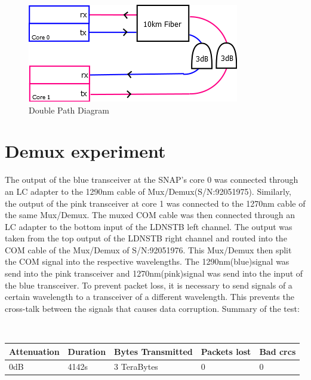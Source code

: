 \documentclass{article}
\begin{document}
\begin{figure}[h!]
\centering
\includegraphics[width=.5\textwidth]{doublepath080415.png}
\caption{Double Path Diagram}
\label{fig:doublefiber}
\end{figure}







\section*{Demux experiment}
The output of the blue transceiver at the SNAP's core 0 was connected through an LC adapter to the 1290nm cable of Mux/Demux(S/N:92051975). Similarly, the output of the pink transceiver at core 1 was connected to the 1270nm cable of the same Mux/Demux. The muxed COM cable was then connected through an LC adapter to the bottom input of the LDNSTB left channel. The output was taken from the top output of the LDNSTB right channel and routed into the COM cable of the Mux/Demux of S/N:92051976. This Mux/Demux then split the COM signal into the respective wavelengths. The 1290nm(blue)signal was send into the pink transceiver and 1270nm(pink)signal was send into the input of the blue transceiver. To prevent packet loss, it is necessary to send signals of a certain wavelength to a transceiver of a different wavelength. This prevents the cross-talk between the signals that causes data corruption. Summary of the test:
\begin{center}
\\
\begin{tabular}{|l|l|l|l|p{2cm}|}
	\hline
	Attenuation & Duration & Bytes Transmitted & Packets lost & Bad crcs \\ \hline
	0dB & 4142s & 3 TeraBytes & 0 & 0 \\ \hline
\end{tabular}	
\end{center}
\end{document}
